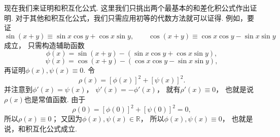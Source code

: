 现在我们来证明和积互化公式.
这里我们只挑出两个最基本的和差化积公式作出证明.
对于其他和积互化公式，我们只需应用初等的代数方法就可以证得.
例如，要证\[
\sin(x+y) \equiv \sin x \cos y + \cos x \sin y,
\qquad
\cos(x+y) \equiv \cos x \cos y - \sin x \sin y
\]成立，
只需构造辅助函数\[
\phi(x)
= \sin(x+y) - (\sin x \cos y + \cos x \sin y),
\]\[
\psi(x)
= \cos(x+y) - (\cos x \cos y - \sin x \sin y),
\]再证明\(\phi(x),\psi(x) \equiv 0\).
令\[
\rho(x)
= [\phi(x)]^2 + [\psi(x)]^2.
\]
并注意到\(\phi'(x) = \psi(x)\)，
\(\psi'(x) = -\phi'(x)\)，
就有\(\rho'(x) \equiv 0\)，
也就是说\(\rho(x)\)也是常值函数.
由于\[
\rho(0) = [\phi(0)]^2 + [\psi(0)]^2 = 0,
\]
所以\(\rho(x) \equiv 0\)；
又因为\(\phi(x),\psi(x) \in \mathbb{R}\)，
所以\(\phi(x),\psi(x) \equiv 0\)，
也就是说，和积互化公式成立.
